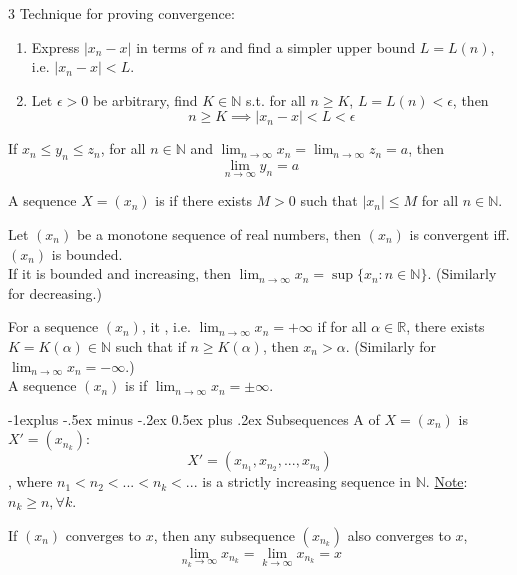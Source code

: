 \documentclass[10pt,landscape,letterpaper]{article}
\makeatletter
\renewcommand{\subsection}{\@startsection{subsection}{2}{0mm}%
                                {-1explus -.5ex minus -.2ex}%
                                {0.5ex plus .2ex}%
                                {\sffamily\normalsize\itshape}}
\makeatother
\begin{document}
\begin{multicols}{3}
Technique for proving convergence:
\begin{enumerate}
    \item Express $|x_n - x|$ in terms of $n$ and find a simpler upper bound $L = L(n)$, i.e. $|x_n - x| < L$.
    \item Let $\epsilon > 0$ be arbitrary, find $K \in \mathbb{N}$ s.t. for all $n \ge K$, $L = L(n) < \epsilon$, then
    \[
        n \ge K \implies |x_n - x| < L < \epsilon
    \]
\end{enumerate}


\smallbreak


 If $x_n \le y_n \le z_n$, for all $n \in \mathbb{N}$ and $\lim_{n \to \infty} x_n = \lim_{n \to \infty} z_n = a$, then
\[
\lim_{n \to \infty} y_n = a
\]



A sequence $X = (x_n)$ is  if there exists $M > 0$ such that $|x_n| \le M$ for all $n \in \mathbb{N}$.



\smallbreak


 Let $(x_n)$ be a monotone sequence of real numbers, then $(x_n)$ is convergent iff. $(x_n)$ is bounded.
\\
If it is bounded and increasing, then $\lim_{n \to \infty} x_n = \sup \{ x_n: n \in \mathbb{N} \}$. (Similarly for decreasing.)


\smallbreak


For a sequence $(x_n)$, it , i.e. $\lim_{n \to \infty} x_n = + \infty$ if for all $\alpha \in \mathbb{R}$, there exists $K = K(\alpha) \in \mathbb{N}$ such that if $n \ge K(\alpha)$, then $x_n > \alpha$. (Similarly for $\lim_{n \to \infty} x_n = - \infty$.)
\\
A sequence $(x_n)$ is  if $\lim_{n \to \infty} x_n = \pm \infty$.




\subsection{Subsequences}
A  of $X = (x_n)$ is $X' = (x_{n_k})$:
\[
X' = (x_{n_1}, x_{n_2}, ..., x_{n_3})
\]
, where $n_1 < n_2 < ... < n_k < ... $ is a strictly increasing sequence in $\mathbb{N}$. \underline{Note}: $n_k \ge n, \forall k$.


 If $(x_n)$ converges to $x$, then any subsequence $(x_{n_k})$ also converges to $x$, 
\[
\lim_{n_k \to \infty} x_{n_k} = \lim_{k \to \infty} x_{n_k} = x
\]



\end{multicols}
\end{document}
